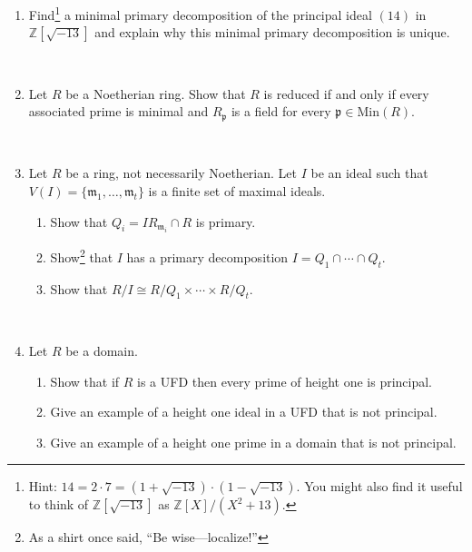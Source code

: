\documentclass[12pt]{amsart}
\newcommand{\Z}{\mathbb{Z}}
\newcommand{\p}{\mathfrak{p}}
\newcommand{\m}{\mathfrak{m}}
\newcommand{\Min}{\mathrm{Min}}
\newcommand{\Ass}{\mathrm{Ass}}
\begin{document}
\begin{enumerate}

\item Find\footnote{Hint: $14=2\cdot 7 = (1+\sqrt{-13}) \cdot (1-\sqrt{-13})$. You might also find it useful to think of $\Z[\sqrt{-13}]$ as $\Z[X]/(X^2+13)$.} a minimal primary decomposition of the principal ideal $(14)$ in $\Z[\sqrt{-13}]$ and explain why this minimal primary decomposition is unique.

\

\item Let $R$ be a Noetherian ring. Show that $R$ is reduced if and only if every associated prime is minimal and $R_\p$ is a field for every $\p\in \Min(R)$.

\

\item Let $R$ be a ring, not necessarily Noetherian. Let $I$ be an ideal such that $V(I) = \{ \m_1,\ldots,\m_t \}$ is a finite set of maximal ideals. 
	\begin{enumerate}
		\item Show that $Q_i = I R_{\m_i} \cap R$ is primary.
		\item Show\footnote{As a shirt once said, ``Be wise---localize!''} that $I$ has a primary decomposition $I=Q_1 \cap \cdots \cap Q_t$.
		\item Show that $R/I \cong R/Q_1 \times \cdots \times R/Q_t$.
	\end{enumerate}


\


\item Let $R$ be a domain. 
\begin{enumerate}
\item Show that if $R$ is a UFD then every prime of height one is principal.
\item Give an example of a height one ideal in a UFD that is not principal.
\item Give an example of a height one prime in a domain that is not principal.
\end{enumerate}



\end{enumerate}
\end{document}
